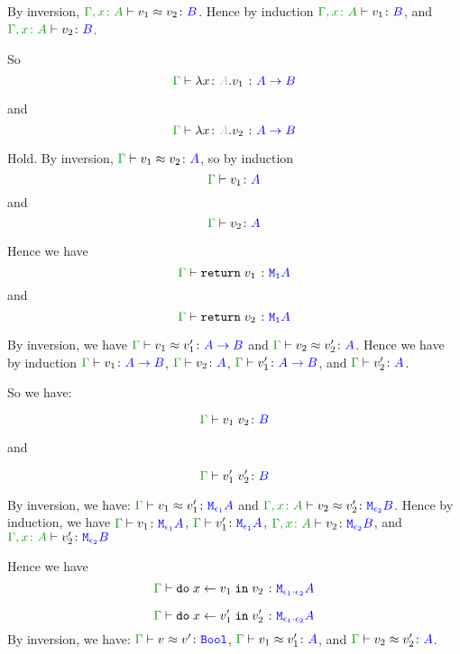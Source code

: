 \documentclass{report}
\begin{document}
    By inversion, $\berelation{\gax}{v_1}{v_2}{B}$. Hence by induction $\typerelation{\gax}{v_1}{B}$, and $\typerelation{\gax}{v_2}{B}$.

    So 
    \begin{equation}
        \gtyperelation{\lam{x}{A}{v_1}}{\ab}
    \end{equation}

    and
    \begin{equation}
        \gtyperelation{\lam{x}{A}{v_2}}{\ab}
    \end{equation}

    Hold.
    By inversion, $\gberelation{v_1}{v_2}{A}$, so by induction $$\gtyperelation{v_1}{A}$$ and $$\gtyperelation{v_2}{A}$$

    Hence we have $$\gtyperelation{\return{v_1}}{\moa}$$
    and
    $$\gtyperelation{\return{v_2}}{\moa}$$

    By inversion, we have $\gberelation{v_1}{v_1'}{\ab}$ and $\gberelation{v_2}{v_2'}{A}$. Hence we have by induction $\gtyperelation{v_1}{\ab}$, $\gtyperelation{v_2}{A}$, $\gtyperelation{v_1'}{\ab}$, and $\gtyperelation{v_2'}{A}$.

    So we have:

    \begin{equation}
        \gtyperelation{\apply{v_1}{v_2}}{B}
    \end{equation}

    and

    
    \begin{equation}
        \gtyperelation{\apply{v_1'}{v_2'}}{B}
    \end{equation}

    By inversion, we have:
    $\gberelation{v_1}{v_1'}{\M{\e_1}{A}}$ and
    $\berelation{\gax}{v_2}{v_2'}{\M{\e_2}{B}}$.
    Hence by induction, we have 
    $\gtyperelation{v_1}{\M{\e_1}{A}}$,
    $\gtyperelation{v_1'}{\M{\e_1}{A}}$,
    $\typerelation{\gax}{v_2}{\M{\e_2}{B}}$, and 
    $\typerelation{\gax}{v_2'}{\M{\e_2}{B}}$

    Hence we have 
    \begin{equation}
        \gtyperelation{\doin{x}{v_1}{v_2}}{\M{\e_1\dot\e_2}{A}}
    \end{equation}

    
    \begin{equation}
        \gtyperelation{\doin{x}{v_1'}{v_2'}}{\M{\e_1\dot\e_2}{A}}
    \end{equation}
By inversion, we have:
$\gberelation{v}{v'}{\B}$,
$\gberelation{v_1}{v_1'}{ A}$, and
$\gberelation{v_2}{v_2'}{ A}$.
\end{document}
